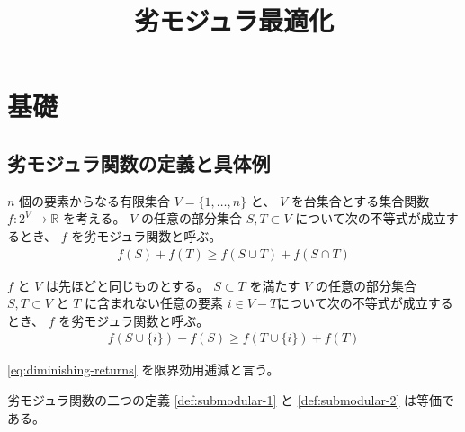 \documentclass{classes/report}
\begin{document}
\title{劣モジュラ最適化}
\maketitle
\tableofcontents

\chapter{基礎}

\section{劣モジュラ関数の定義と具体例}

\begin{tcolorbox}
\begin{Def}[劣モジュラ関数　その１] \label{def:submodular-1}
    $n$ 個の要素からなる有限集合 $V=\{1, \dots, n\}$ と、 $V$ を台集合とする集合関数 $f: 2^V \to \mathbb{R}$ を考える。
    $V$ の任意の部分集合 $S, T \subset V$ について次の不等式が成立するとき、 $f$ を劣モジュラ関数と呼ぶ。
    \begin{align}
        f(S) + f(T) \ge f(S \cup T) + f(S \cap T) \label{eq:def-submodular}
    \end{align}
\end{Def}

\begin{Def}[劣モジュラ関数　その２] \label{def:submodular-2}
    $f$ と $V$ は先ほどと同じものとする。
    $S \subset T$ を満たす $V$ の任意の部分集合 $S, T \subset V$ と $T$ に含まれない任意の要素 $i \in V - T$について次の不等式が成立するとき、 $f$ を劣モジュラ関数と呼ぶ。
    \begin{align}
        f(S \cup \{i\}) - f(S) \ge f(T \cup \{i\}) + f(T) \label{eq:diminishing-returns}
    \end{align}
\end{Def}

\ref{eq:diminishing-returns} を限界効用逓減と言う。
\end{tcolorbox}

\begin{prop}[二つの定義の等価性]
    劣モジュラ関数の二つの定義 \ref{def:submodular-1} と \ref{def:submodular-2} は等価である。
\end{prop}
\end{document}
